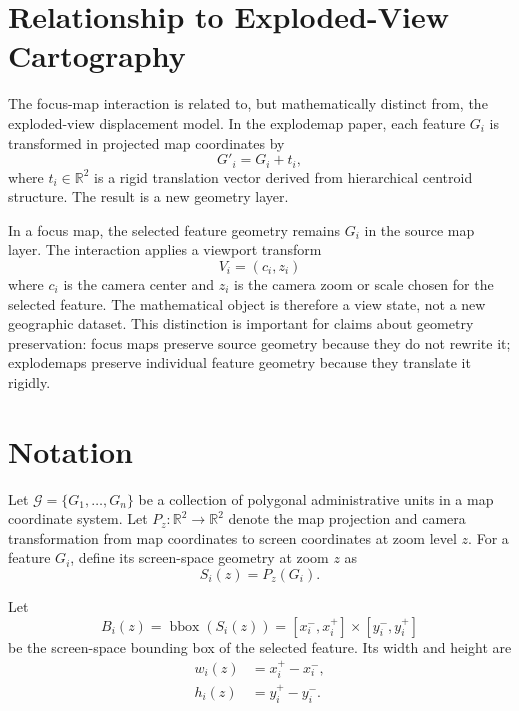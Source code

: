 \documentclass[12pt, a4paper]{article}
\numberwithin{equation}{section}
\newcommand{\R}{\mathbb{R}}
\newcommand{\bbox}{\operatorname{bbox}}
\begin{document}
\section{Relationship to Exploded-View Cartography}

The focus-map interaction is related to, but mathematically distinct from, the exploded-view displacement model. In the explodemap paper, each feature $G_i$ is transformed in projected map coordinates by
\begin{equation}
  G'_i = G_i + t_i,
\end{equation}
where $t_i \in \R^2$ is a rigid translation vector derived from hierarchical centroid structure. The result is a new geometry layer.

In a focus map, the selected feature geometry remains $G_i$ in the source map layer. The interaction applies a viewport transform
\begin{equation}
  V_i = (c_i, z_i)
\end{equation}
where $c_i$ is the camera center and $z_i$ is the camera zoom or scale chosen for the selected feature. The mathematical object is therefore a view state, not a new geographic dataset. This distinction is important for claims about geometry preservation: focus maps preserve source geometry because they do not rewrite it; explodemaps preserve individual feature geometry because they translate it rigidly.

\section{Notation}

Let $\mathcal{G} = \{G_1,\ldots,G_n\}$ be a collection of polygonal administrative units in a map coordinate system. Let $P_z: \R^2 \to \R^2$ denote the map projection and camera transformation from map coordinates to screen coordinates at zoom level $z$. For a feature $G_i$, define its screen-space geometry at zoom $z$ as
\begin{equation}
  S_i(z) = P_z(G_i).
\end{equation}

Let
\begin{equation}
  B_i(z) = \bbox(S_i(z)) = [x_i^-, x_i^+] \times [y_i^-, y_i^+]
\end{equation}
be the screen-space bounding box of the selected feature. Its width and height are
\begin{align}
  w_i(z) &= x_i^+ - x_i^-, \\
  h_i(z) &= y_i^+ - y_i^-.
\end{align}
\end{document}
